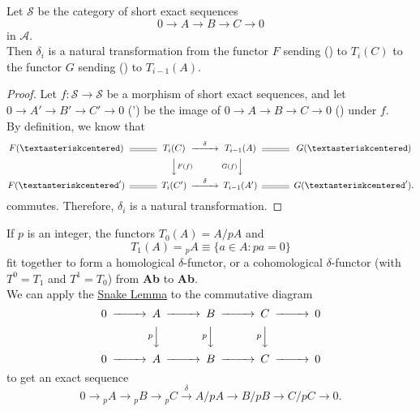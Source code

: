 \begin{exercise}
	Let $\mathcal{S}$ be the category of short exact sequences
	\begin{equation}
		0 \rightarrow A \rightarrow B \rightarrow C \rightarrow 0 \tag{\textasteriskcentered}
	\end{equation}
	in $\mathcal{A}$. \\
	Then $\delta_i$ is a natural transformation from the functor $F$ sending (\textasteriskcentered) to $T_i(C)$ to the functor $G$ sending (\textasteriskcentered) to $T_{i-1}(A)$.
\end{exercise}

\begin{proof}
	Let $f:\mathcal{S}\rightarrow\mathcal{S}$ be a morphism of short exact sequences, and let $0 \rightarrow A' \rightarrow B' \rightarrow C' \rightarrow 0$ (\textasteriskcentered') be the image of $0 \rightarrow A \rightarrow B \rightarrow C \rightarrow 0$ (\textasteriskcentered) under $f$. \\
	By definition, we know that
	\begin{align*}
		\begin{CD}
			F(\textasteriskcentered) @= T_i(C) @>\delta>> T_{i-1}(A) @= G(\textasteriskcentered) \\
			@.  				@VVF(f)V 			@VG(f)VV 			@. \\
			F(\textasteriskcentered') @= T_i(C') @>\delta>> T_{i-1}(A') @= G(\textasteriskcentered').
		\end{CD}
	\end{align*}
	commutes.
	Therefore, $\delta_i$ is a natural transformation.
\end{proof}

\begin{example}[p-torsion]
	If $p$ is an integer, the functors $T_0(A)=A/pA$ and 
	$$T_1(A) = {_p}A \equiv \{a\in A:pa=0\}$$
	fit together to form a homological $\delta$-functor, or a cohomological $\delta$-functor (with $T^0=T_1$ and $T^1=T_0$) from \textbf{Ab} to \textbf{Ab}.\\
	We can apply the \hyperref[snake_lemma]{Snake Lemma} to the commutative diagram
	\begin{align*}
		\begin{CD}
			0 @>>> A @>>> B @>>> C @>>> 0 \\
			@.	 @VpVV	 @VpVV	@VpVV  @. \\
			0 @>>> A @>>> B @>>> C @>>> 0 \\
		\end{CD}
	\end{align*}
	to get an exact sequence
	$$0 \rightarrow {_p}A \rightarrow {_p}B \rightarrow {_p}C \overset{\delta}{\longrightarrow} A/pA \rightarrow B/pB \rightarrow C/pC \rightarrow 0.$$
\end{example}

